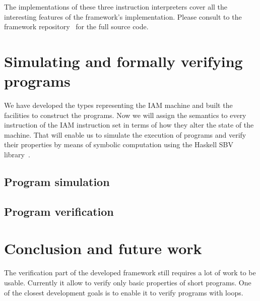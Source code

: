 The implementations of these three instruction interpreters cover all the interesting
features of the framework's implementation. Please consult to the framework
repository~\cite{IAMGithub} for the full source code.

\section{Simulating and formally verifying programs}

We have developed the types representing the IAM machine and built the facilities
to construct the programs. Now we will assign the semantics to every instruction
of the IAM instruction set in terms of how they alter the state of the machine.
That will enable us to simulate the execution of programs and verify their properties
by means of symbolic computation using the Haskell SBV library~\cite{SBV}.



\subsection{Program simulation}



\subsection{Program verification}

\section{Conclusion and future work}

The verification part of the developed framework still requires a lot of work to be usable. Currently it allow to verify only basic properties of short programs. One of the closest development goals is to enable it to verify programs with loops.

\printbibliography[
     heading=bibintoc %
    , title=Bibliography %
]

